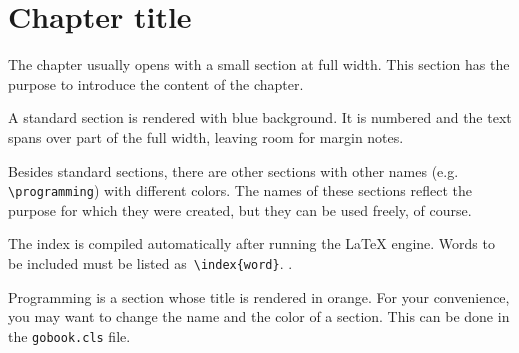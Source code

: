 \chapter{Chapter title}
The chapter usually opens with a small section at full width. This section has the purpose to introduce the content of the chapter.

\lipsum[1]
A standard section is rendered with blue background. It is numbered and the text spans over part of the full width, leaving room for margin notes. 

Besides standard sections, there are other sections with other names (e.g. {\tt \textbackslash{programming}}) with different colors. The names of these sections reflect the purpose for which they were created, but they can be used freely, of course.

The index is compiled automatically after running the \LaTeX{} engine. Words to be included must be listed as~{\tt \textbackslash{index\{word}\}}. \lipsum[2-4].

Programming is a section whose title is rendered in orange. For your convenience, you may want to change the name and the color of a section. This can be done in the {\tt gobook.cls} file. 

